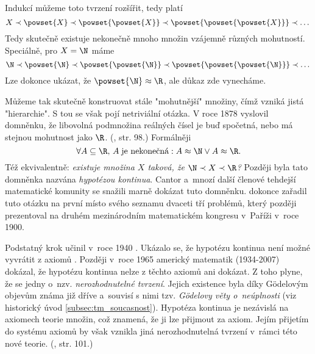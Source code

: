 \begin{remark}
    Indukcí můžeme toto tvrzení rozšířit, tedy platí
    \begin{equation*}
        X\prec\powset{X}\prec\powset{\powset{X}}\prec\powset{\powset{\powset{X}}}\prec\dots
    \end{equation*}
    Tedy skutečně existuje nekonečně mnoho množin vzájemně různých mohutností. Speciálně, pro $X=\N$ máme
    \begin{equation*}
        \N\prec\powset{\N}\prec\powset{\powset{\N}}\prec\powset{\powset{\powset{\N}}}\prec\dots
    \end{equation*}
    Lze dokonce ukázat, že $\powset{\N}\approx\R$, ale důkaz zde vynecháme.
\end{remark}
\medskip

Můžeme tak skutečně konstruovat stále "mohutnější" množiny, čímž vzniká jistá "hierarchie". S tou se však pojí netriviální otázka. V roce 1878 vyslovil  domněnku, že libovolná podmnožina reálných čísel je buď spočetná, nebo má stejnou mohutnost jako $\R$. (\cite{BalcarStepanek1986}, str. 98.) Formálněji
\begin{equation*}
    \forall A\subseteq\R,\,A\;\text{je nekonečná}: A\approx\N \lor A\approx\R.
\end{equation*}
Též ekvivalentně: \emph{existuje množina $X$ taková, že $\N\prec X\prec\R$?} Později byla tato domněnka nazvána \emph{hypotézou kontinua}. Cantor a~mnozí další členové tehdejší matematické komunity se snažili marně dokázat tuto domněnku.  dokonce zařadil tuto otázku na první místo svého seznamu dvaceti tří problémů, který později prezentoval na druhém mezinárodním matematickém kongresu v~Paříži v~roce 1900.\par
Podstatný krok učinil v~roce 1940 . Ukázalo se, že hypotézu kontinua není možné vyvrátit z axiomů \ZF{}. Později v~roce 1965 americký matematik  \mbox{(1934-2007)} dokázal, že hypotézu kontinua nelze z těchto axiomů ani dokázat. Z toho plyne, že se jedny o~nzv. \emph{nerozhodnutelné tvrzení}. Jejich existence byla díky Gödelovým objevům známa již dříve a~souvisí s nimi tzv. \emph{Gödelovy věty o~neúplnosti} (viz historický úvod \ref{subsec:tm_soucasnost}). Hypotéza kontinua je nezávislá na axiomech teorie množin, což znamená, že ji lze přijmout za axiom. Jejím přijetím do systému axiomů by však vznikla jiná nerozhodnutelná tvrzení v~rámci této nové teorie. (\cite{Fuchs2003}, str. 101.)